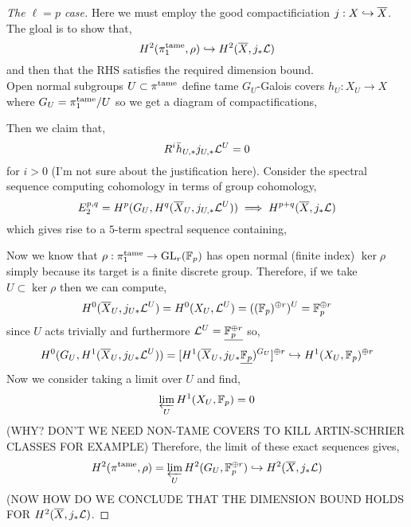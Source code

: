 \documentclass[12pt]{article}
\begin{document}
\begin{proof}[The $\ell = p$ case]
Here we must employ the good compactificiation $j : X \hookrightarrow \overline{X}$. The gloal is to show that,
\[ H^2(\pi_1^{\mathrm{tame}}, \rho) \hookrightarrow H^2(\overline{X}, j_* \mathcal{L}) \]
and then that the RHS satisfies the required dimension bound. 
\bigskip\\
Open normal subgroups $U \subset \pi^{\mathrm{tame}}$ define tame $G_U$-Galois covers $h_U : X_U \to X$ where $G_U = \pi_1^{\mathrm{tame}} / U$ so we get a diagram of compactifications,
\begin{center}
\end{center} 
Then we claim that,
\[ R^i \bar{h}_{U, *} j_{U, *} \mathcal{L}^U = 0 \]
for $i > 0$ (I'm not sure about the justification here). Consider the spectral sequence computing \etale cohomology in terms of group cohomology,
\[ E^{p,q}_2 = H^p(G_U, H^q(\overline{X}_U, j_{U,*} \mathcal{L}^U)) \implies H^{p+q}(\overline{X}, j_* \mathcal{L}) \]
which gives rise to a $5$-term spectral sequence containing,
\begin{center}
\end{center} 
Now we know that $\rho : \pi_1^{\mathrm{tame}} \to \mathrm{GL}_r(\mathbb{F}_p)$ has open normal (finite index) $\ker{\rho}$ simply because its target is a finite discrete group. Therefore, if we take $U \subset \ker{\rho}$ then we can compute,
\[ H^0(\overline{X}_U, j_{U *} \mathcal{L}^U) = H^0(X_U, \mathcal{L}^U) = ((\mathbb{F}_p)^{\oplus r})^U = \mathbb{F}_p^{\oplus r} \] 
since $U$ acts trivially and furthermore $\mathcal{L}^U = \underline{\mathbb{F}_p^{\oplus r}}$ so, 
\[  H^0(G_U, H^1(\overline{X}_U, j_{U*} \mathcal{L}^U)) = [H^1(\overline{X}_U, j_{U*} \underline{\mathbb{F}_p})^{G_U}]^{\oplus r} \hookrightarrow H^1(X_U, \mathbb{F}_p)^{\oplus r} \]
Now we consider taking a limit over $U$ and find,
\[ \varprojlim_U H^1(X_U, \mathbb{F}_p) = 0 \]
(WHY? DON'T WE NEED NON-TAME COVERS TO KILL ARTIN-SCHRIER CLASSES FOR EXAMPLE)
Therefore, the limit of these exact sequences gives,
\[ H^2(\pi^{\mathrm{tame}}, \rho) = \varprojlim_U H^2(G_U, \mathbb{F}_p^{\oplus r}) \hookrightarrow H^2(\overline{X}, j_* \mathcal{L}) \]
(NOW HOW DO WE CONCLUDE THAT THE DIMENSION BOUND HOLDS FOR $H^2(\overline{X}, j_* \mathcal{L})$.
\end{proof}
\end{document}
